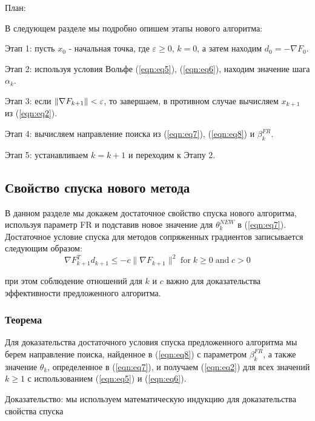 \noindent План:

\noindent В следующем разделе мы подробно опишем этапы нового алгоритма:

\noindent Этап 1: пусть $x_{0}$ - начальная точка, где $\varepsilon \ge 0$, $k = 0$, 
а затем находим $ d_{0} = -\nabla F_{0} $.

\noindent Этап 2: используя условия Вольфе (\ref{eqn:eq5}), (\ref{eqn:eq6}),
находим значение шага $ \alpha_{k} $.

\noindent Этап 3: если $ \|{\cal \nabla}F_{k+1}\|<\varepsilon $, то завершаем, в
противном случае вычисляем $ x_{k+1} $ из (\ref{eqn:eq2}).

\noindent Этап 4: вычисляем направление поиска из (\ref{eqn:eq7}),
(\ref{eqn:eq8}) и $ \beta_{k}^{FR} $.

\noindent Этап 5: устанавливаем $ k = k + 1 $ и переходим к Этапу 2.

\subsection{Свойство спуска нового метода}

В данном разделе мы докажем достаточное свойство спуска нового алгоритма,
используя параметр FR и подставив новое значение для $\theta_{k}^{NEW}$ в
(\ref{eqn:eq7}). Достаточное условие спуска для методов сопряженных градиентов
записывается следующим образом:
\begin{equation}\label{eqn:eq9}
    \nabla F_{k+1}^{T}d_{k+1}\leq-c\|\nabla F_{k+1}\|^{2}\;\mathrm{for}\;k\geq0\;\mathrm{and}\;c>0
\end{equation}

при этом соблюдение отношений для $k$ и $c$ важно для доказательства
эффективности предложенного алгоритма.

\subsubsection{Теорема}

Для доказательства достаточного условия спуска предложенного алгоритма мы берем
направление поиска, найденное в (\ref{eqn:eq8}) с параметром $\beta_{k}^{FR}$, а
также значение $\theta_{k}$, определенное в (\ref{eqn:eq7}), и получаем
(\ref{eqn:eq2}) для всех значений $k \geq 1$ с использованием (\ref{eqn:eq5}) и
(\ref{eqn:eq6}).

\noindent Доказательство: мы используем математическую индукцию для
доказательства свойства спуска

